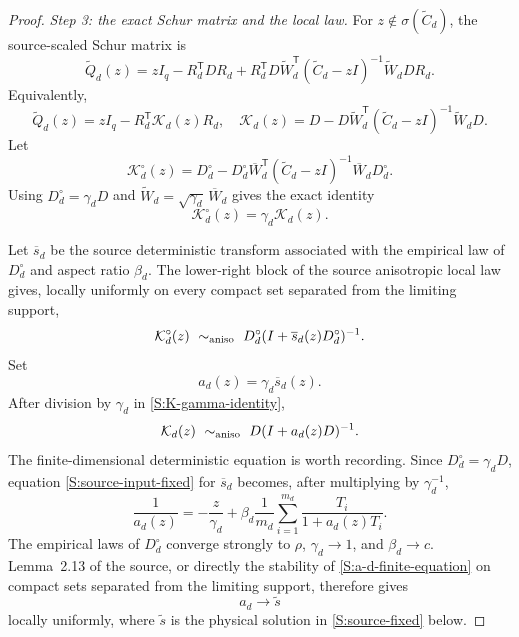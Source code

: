 \begin{proof}
\emph{Step 3: the exact Schur matrix and the local law.}
For $z\notin\sigma(\widetilde C_d)$, the source-scaled Schur matrix is
\begin{equation}
\widetilde Q_d(z)
=
zI_q-R_d^{\mathsf T}DR_d
+
R_d^{\mathsf T}D\widetilde W_d^{\mathsf T}
(\widetilde C_d-zI)^{-1}
\widetilde W_dDR_d.
\label{S:source-Q}
\end{equation}
Equivalently,
\begin{equation}
\widetilde Q_d(z)=zI_q-R_d^{\mathsf T}\mathcal K_d(z)R_d,
\quad
\mathcal K_d(z)
=
D-D\widetilde W_d^{\mathsf T}
(\widetilde C_d-zI)^{-1}\widetilde W_dD.
\label{S:K-block}
\end{equation}
Let
\begin{equation}
\mathcal K_d^\circ(z)
=
D_d^\circ-D_d^\circ\overline W_d^{\mathsf T}
(\widetilde C_d-zI)^{-1}\overline W_dD_d^\circ.
\end{equation}
Using $D_d^\circ=\gamma_dD$ and
$\widetilde W_d=\sqrt{\gamma_d}\,\overline W_d$ gives the exact identity
\begin{equation}
\mathcal K_d^\circ(z)=\gamma_d\mathcal K_d(z).
\label{S:K-gamma-identity}
\end{equation}

Let $\overline s_d$ be the source deterministic transform associated with
the empirical law of $D_d^\circ$ and aspect ratio $\beta_d$.  The
lower-right block of the source anisotropic local law gives, locally
uniformly on every compact set separated from the limiting support,
\begin{equation}
\mathcal K_d^\circ(z)
\ \sim_{\rm aniso}\
D_d^\circ(I+\overline s_d(z)D_d^\circ)^{-1}.
\end{equation}
Set
\begin{equation}
a_d(z)=\gamma_d\overline s_d(z).
\label{S:a-d-definition}
\end{equation}
After division by $\gamma_d$ in \eqref{S:K-gamma-identity},
\begin{equation}
\mathcal K_d(z)
\ \sim_{\rm aniso}\
D(I+a_d(z)D)^{-1}.
\label{S:K-local-law}
\end{equation}
The finite-dimensional deterministic equation is worth recording.  Since
$D_d^\circ=\gamma_dD$, equation
\eqref{S:source-input-fixed} for $\overline s_d$ becomes, after multiplying
by $\gamma_d^{-1}$,
\begin{equation}
\frac1{a_d(z)}
=-\frac{z}{\gamma_d}
+\beta_d\frac1{m_d}\sum_{i=1}^{m_d}
\frac{T_i}{1+a_d(z)T_i}.
\label{S:a-d-finite-equation}
\end{equation}
The empirical laws of $D_d^\circ$ converge strongly to $\rho$,
$\gamma_d\to1$, and $\beta_d\to c$.  Lemma~2.13 of the source, or directly
the stability of \eqref{S:a-d-finite-equation} on compact sets separated
from the limiting support, therefore gives
\begin{equation}
a_d\longrightarrow\widetilde s
\label{S:a-d-limit}
\end{equation}
locally uniformly, where $\widetilde s$ is the physical solution in
\eqref{S:source-fixed} below.


\end{proof}
